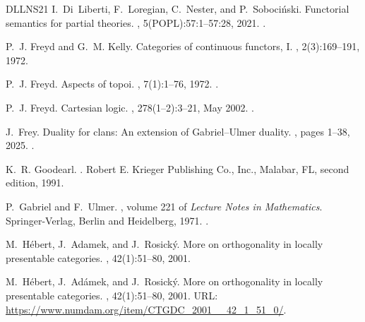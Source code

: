 \documentclass[a4paper,10pt,reqno]{amsart}
\theoremstyle{definition}
\theoremstyle{remark}
\begin{document}
\begin{thebibliography}{DLLNS21}
  I.~Di~Liberti, F.~Loregian, C.~Nester, and P.~Soboci{\'n}ski.
  \newblock Functorial semantics for partial theories.
  , 5(POPL):57:1--57:28, 2021.
  \newblock \href {https://doi.org/10.1145/3434338} {}.
  
  P.~J. Freyd and G.~M. Kelly.
  \newblock Categories of continuous functors, {I}.
  , 2(3):169--191, 1972.
  
  P.~J. Freyd.
  \newblock Aspects of topoi.
  , 7(1):1--76, 1972.
  \newblock \href {https://doi.org/10.1017/S0004972700044828} {}.
  
  P.~J. Freyd.
  \newblock Cartesian logic.
  , 278(1--2):3--21, May 2002.
  \newblock \href {https://doi.org/10.1016/S0304-3975(00)00328-5} {}.
  
  J.~Frey.
  \newblock Duality for clans: An extension of {Gabriel--Ulmer} duality.
  , pages 1--38, 2025.
  \newblock \href {https://doi.org/10.1017/jsl.2024.79} {}.
  
  K.~R. Goodearl.
  .
  \newblock Robert E. Krieger Publishing Co., Inc., Malabar, FL, second edition, 1991.
  
  P.~Gabriel and F.~Ulmer.
  , volume 221 of {\em Lecture Notes in Mathematics}.
  \newblock Springer-Verlag, Berlin and Heidelberg, 1971.
  \newblock \href {https://doi.org/10.1007/BFb0059396} {}.
  
  M.~H{\'e}bert, J.~Adamek, and J.~Rosick\'y.
  \newblock More on orthogonality in locally presentable categories.
  , 42(1):51--80, 2001.
  
  M.~H{\'e}bert, J.~Ad{\'a}mek, and J.~Rosick{\'y}.
  \newblock More on orthogonality in locally presentable categories.
  , 42(1):51--80, 2001.
  \newblock URL: \url{https://www.numdam.org/item/CTGDC_2001__42_1_51_0/}.
  

\end{thebibliography}
\end{document}
